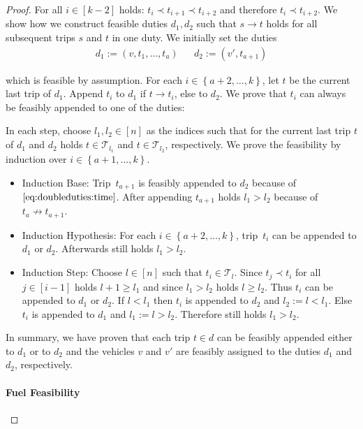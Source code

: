 \begin{proof}
For all ${i\in[k-2]}$ holds: ${t_i\prec t_{i+1}\prec t_{i+2}}$ and therefore ${t_i\prec t_{i+2}}$. We show how we construct feasible duties $d_1,d_2$ such that ${s\to t}$ holds for all subsequent trips $s$ and $t$ in one duty. We initially set the duties
\begin{align*}
	d_1 := \left(v,t_1,\dots,t_a\right) && d_2 := \left(v',t_{a+1}\right)
\end{align*}

which is feasible by assumption. For each ${i\in\left\{a+2,\dots, k\right\}}$, let $t$ be the current last trip of $d_1$. Append $t_i$ to $d_1$ if ${t\to t_i}$, else to $d_2$. We prove that $t_i$ can always be feasibly appended to one of the duties:

In each step, choose ${l_1,l_2\in[n]}$ as the indices such that for the current last trip $t$ of $d_1$ and $d_2$ holds ${t\in\mathcal{T}_{l_1}}$ and ${t\in\mathcal{T}_{l_2}}$, respectively. We prove the feasibility by induction over ${i\in\left\{a+1,\dots, k\right\}}$.
\begin{itemize}
	\item{Induction Base:}
		Trip~$t_{a+1}$ is feasibly appended to $d_2$ because of $\eqref{eq:doubleduties:time}$. After appending $t_{a+1}$ holds ${l_1>l_2}$ because of $t_a\not\to t_{a+1}$. 
	\item{Induction Hypothesis:} 
		For each ${i\in\left\{a+2,\dots, k\right\}}$, trip~$t_i$ can be appended to $d_1$ or $d_2$. Afterwards still holds ${l_1>l_2}$.
	\item{Induction Step:}
		Choose ${l\in[n]}$ such that ${t_i\in\mathcal{T}_l}$. Since $t_j\prec t_i$ for all ${j\in[i-1]}$ holds ${l+1\geq l_1}$ and since ${l_1>l_2}$ holds ${l\geq l_2}$. Thus $t_i$ can be appended to $d_1$ or $d_2$. If ${l<l_1}$ then $t_i$ is appended to $d_2$ and ${l_2 := l<l_1}$. Else $t_i$ is appended to $d_1$ and ${l_1 := l>l_2}$. Therefore still holds ${l_1>l_2}$.
\end{itemize}

In summary, we have proven that each trip ${t\in d}$ can be feasibly appended either to $d_1$ or to $d_2$ and the vehicles $v$ and $v'$ are feasibly assigned to the duties $d_1$ and $d_2$, respectively.

\paragraph{Fuel Feasibility} \proofparfill


\end{proof}
